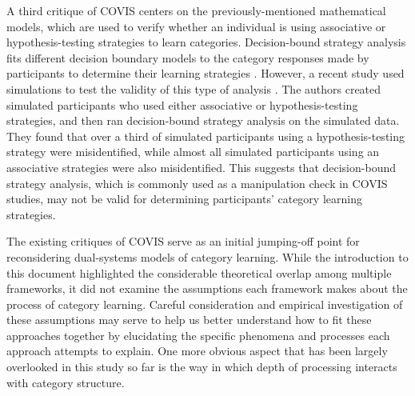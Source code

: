 \documentclass[../dissertation.tex]{subfiles}
\begin{document}
	A third critique of COVIS centers on the previously-mentioned mathematical models, which are used to verify whether an individual is using associative or hypothesis-testing strategies to learn categories. Decision-bound strategy analysis fits different decision boundary models to the category responses made by participants to determine their learning strategies \citep{Maddox1993}. However, a recent study used simulations to test the validity of this type of analysis \citep{Edmunds2018}. The authors created simulated participants who used either associative or hypothesis-testing strategies, and then ran decision-bound strategy analysis on the simulated data. They found that over a third of simulated participants using a hypothesis-testing strategy were misidentified, while almost all simulated participants using an associative strategies were also misidentified. This suggests that decision-bound strategy analysis, which is commonly used as a manipulation check in COVIS studies, may not be valid for determining participants' category learning strategies. \par
	The existing critiques of COVIS serve as an initial jumping-off point for reconsidering dual-systems models of category learning. While the introduction to this document highlighted the considerable theoretical overlap among multiple frameworks, it did not examine the assumptions each framework makes about the process of category learning. Careful consideration and empirical investigation of these assumptions may serve to help us better understand how to fit these approaches together by elucidating the specific phenomena and processes each approach attempts to explain. One more obvious aspect that has been largely overlooked in this study so far is the way in which depth of processing interacts with category structure.
	
\end{document}
